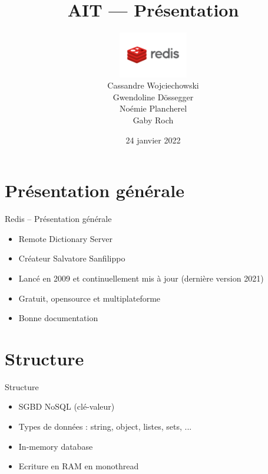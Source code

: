 \documentclass[aspectratio=169]{beamer}
\title{AIT --- Présentation}
\author{\includegraphics[height=2cm]{logo}\\Cassandre Wojciechowski \\ Gwendoline Dössegger \\ Noémie Plancherel \\ Gaby Roch}
\date{24 janvier 2022}
\begin{document}
\begin{frame}
  \titlepage
\end{frame}

\section{Présentation générale}
\begin{frame}{Redis -- Présentation générale}
 \begin{itemize}
  \item Remote Dictionary Server
  \item Créateur Salvatore Sanfilippo
  \item Lancé en 2009 et continuellement mis à jour (dernière version 2021)
  \item Gratuit, opensource et multiplateforme
  \item Bonne documentation
 \end{itemize}
\end{frame}

\section{Structure}
\begin{frame}{Structure}
\begin{itemize}
  \item SGBD NoSQL (clé-valeur)
  \item Types de données : string, object, listes, sets, ...
  \item In-memory database
  \item Ecriture en RAM en monothread 
\end{itemize}
\end{frame}
\end{document}
